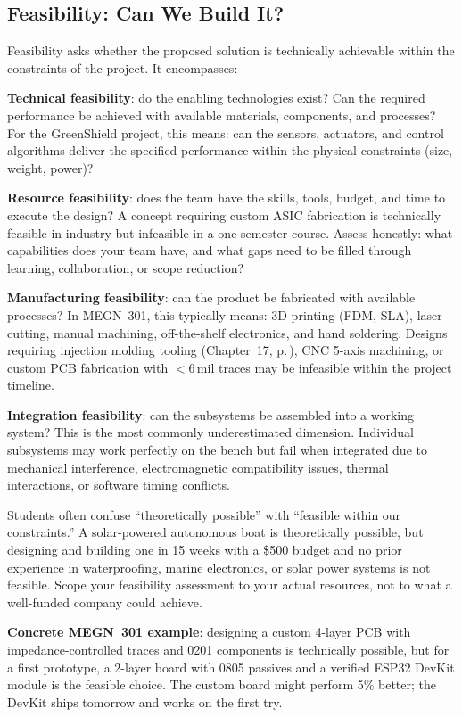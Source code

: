 \documentclass[11pt,letterpaper,twoside,openany]{book}
\begin{document}
\subsection{Feasibility: Can We Build It?}
Feasibility asks whether the proposed solution is technically achievable within the constraints of the project. It encompasses:

\textbf{Technical feasibility}: do the enabling technologies exist? Can the required performance be achieved with available materials, components, and processes? For the GreenShield project, this means: can the sensors, actuators, and control algorithms deliver the specified performance within the physical constraints (size, weight, power)?

\textbf{Resource feasibility}: does the team have the skills, tools, budget, and time to execute the design? A concept requiring custom ASIC fabrication is technically feasible in industry but infeasible in a one-semester course. Assess honestly: what capabilities does your team have, and what gaps need to be filled through learning, collaboration, or scope reduction?

\textbf{Manufacturing feasibility}: can the product be fabricated with available processes? In MEGN~301, this typically means: 3D printing (FDM, SLA), laser cutting, manual machining, off-the-shelf electronics, and hand soldering. Designs requiring injection molding tooling (Chapter~17, p.\,\pageref{ch:molding}), CNC 5-axis machining, or custom PCB fabrication with $<$6\,mil traces may be infeasible within the project timeline.

\textbf{Integration feasibility}: can the subsystems be assembled into a working system? This is the most commonly underestimated dimension. Individual subsystems may work perfectly on the bench but fail when integrated due to mechanical interference, electromagnetic compatibility issues, thermal interactions, or software timing conflicts.

\begin{warningbox}
Students often confuse ``theoretically possible'' with ``feasible within our constraints.'' A solar-powered autonomous boat is theoretically possible, but designing and building one in 15 weeks with a \$500 budget and no prior experience in waterproofing, marine electronics, or solar power systems is not feasible. Scope your feasibility assessment to your actual resources, not to what a well-funded company could achieve.

\textbf{Concrete MEGN~301 example}: designing a custom 4-layer PCB with impedance-controlled traces and 0201 components is technically possible, but for a first prototype, a 2-layer board with 0805 passives and a verified ESP32 DevKit module is the feasible choice. The custom board might perform 5\% better; the DevKit ships tomorrow and works on the first try.
\end{warningbox}
\end{document}
